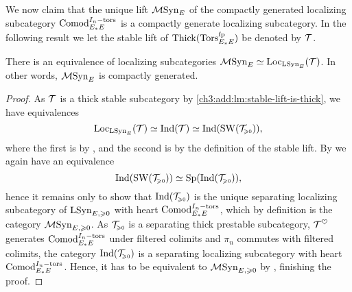 We now claim that the unique lift $\MSynE$ of the compactly generated localizing subcategory $\Comodt$ is a compactly generate localizing subcategory. In the following result we let the stable lift of $\Thick(\TorsE)$ be denoted by $\T$. 

\begin{theorem}
    There is an equivalence of localizing subcategories $\MSynE \simeq \Loc_{\LSynE}(\T)$. In other words, $\MSynE$ is compactly generated. 
\end{theorem}
\begin{proof}
    As $\T$ is a thick stable subcategory by \cref{ch3:add:lm:stable-lift-is-thick}, we have equivalences 
    \[\Loc_{\LSynE}(\T)\simeq \Ind(\T)\simeq \Ind(\SW(\T\geqz)),\]
    where the first is by \cite[2.15]{barthel-heard-valenzuela_2018}, and the second is by the definition of the stable lift. By \cite[C.1.1.6]{lurie_SAG} we again have an equivalence
    \[\Ind(\SW(\T\geqz)) \simeq \Sp(\Ind(\T\geqz)),\]
    hence it remains only to show that $\Ind(\T\geqz)$ is the unique separating localizing subcategory of $\LSyn_{E, \geq 0}$ with heart $\Comodt$, which by definition is the category $\MSyn_{E, \geq 0}$. As $\T\geqz$ is a separating thick prestable subcategory, $\T^\heart$ generates $\Comodt$ under filtered colimits and $\pi_n$ commutes with filtered colimits, the category $\Ind(\T\geqz)$ is a separating localizing subcategory with heart $\Comodt$. Hence, it has to be equivalent to $\MSyn_{E, \geq 0}$ by \cite[C.5.2.5, C.5.2.6]{lurie_SAG}, finishing the proof. 
\end{proof}


    


